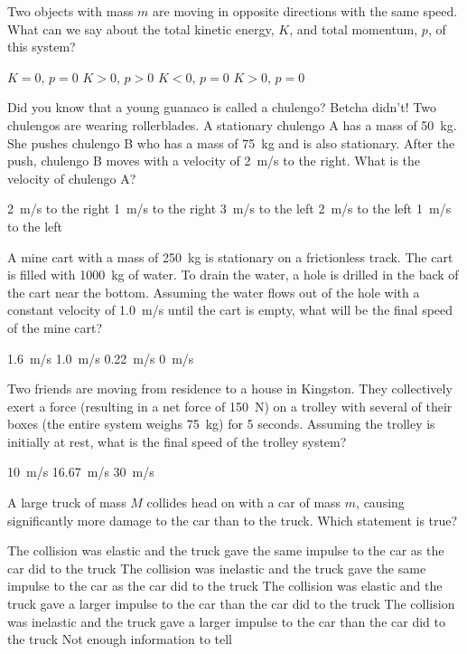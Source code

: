 \question Two objects with mass $m$ are moving in opposite directions with the same speed. What can we say about the total kinetic energy, $K$, and total momentum, $p$, of this system?
\begin{checkboxes}
\choice $K = 0$, $p = 0$
\choice $K > 0$, $p > 0$
\choice $K < 0$, $p = 0$
\CorrectChoice $K > 0$, $p=0$ \correct
\end{checkboxes}

\question Did you know that a young guanaco is called a chulengo? Betcha didn't! Two chulengos are wearing rollerblades. A stationary chulengo A has a mass of \SI{50}{kg}. She pushes chulengo B who has a mass of \SI{75}{kg} and is also stationary. After the push, chulengo B moves with a velocity of \SI{2}{m/s} to the right. What is the velocity of chulengo A?
\begin{checkboxes}
\choice \SI{2}{m/s} to the right
\choice \SI{1}{m/s} to the right
\CorrectChoice \SI{3}{m/s} to the left \correct
\choice \SI{2}{m/s} to the left
\choice \SI{1}{m/s} to the left
\end{checkboxes}


\question A mine cart with a mass of \SI{250}{\kilo\gram} is stationary on a frictionless track. The cart is filled with \SI{1000}{\kilo\gram} of water. To drain the water, a hole is drilled in the back of the cart near the bottom. Assuming the water flows out of the hole with a constant velocity of \SI{1.0}{m/s} until the cart is empty, what will be the final speed of the mine cart?
\begin{checkboxes}
\CorrectChoice \SI{1.6}{m/s} \correct
\choice \SI{1.0}{m/s}
\choice \SI{0.22}{m/s}
\choice \SI{0}{m/s}
\end{checkboxes}

\question Two friends are moving from residence to a house in Kingston. They collectively exert a force (resulting in a net force of \SI{150}{N}) on a trolley with several of their boxes (the entire system weighs \SI{75}{kg}) for 5 seconds. Assuming the trolley is initially at rest, what is the final speed of the trolley system?
\begin{checkboxes}
\CorrectChoice \SI{10}{m/s} \correct
\choice \SI{16.67}{m/s}
\choice \SI{30}{m/s}
\end{checkboxes}

\question A large truck of mass $M$ collides head on with a car of mass $m$, causing significantly more damage to the car than to the truck. Which statement is true?
\begin{checkboxes} 
\choice The collision was elastic and the truck gave the same impulse to the car as the car did to the truck
\CorrectChoice The collision was inelastic and the truck gave the same impulse to the car as the car did to the truck \correct
\choice The collision was elastic and the truck gave a larger impulse to the car than the car did to the truck
\choice The collision was inelastic and the truck gave a larger impulse to the car than the car did to the truck
\choice Not enough information to tell
\end{checkboxes}

